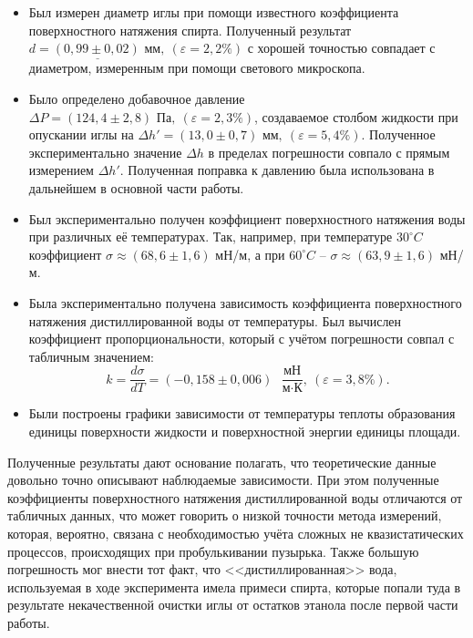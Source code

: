 \documentclass[a4paper, 12pt]{article}
\begin{document}
    \begin{itemize}
        \item Был измерен диаметр иглы при помощи известного коэффициента поверхностного натяжения спирта. Полученный результат $\underline{ d = (0,99 \pm 0,02) \text{ мм},} \: (\varepsilon = 2,2\%)$ с хорошей точностью совпадает с диаметром, измеренным при помощи светового микроскопа.
    	
        \item Было определено добавочное давление ${\Delta P = (124,4 \pm 2,8) \text{ Па},} \: (\varepsilon = 2,3\%)$, создаваемое столбом жидкости при опускании иглы на ${\Delta h' = (13,0 \pm 0,7) \text{ мм},} \: (\varepsilon = 5,4\%). $ Полученное экспериментально значение $\Delta h$ в пределах погрешности совпало с прямым измерением $\Delta h'$. Полученная поправка к давлению была использована в дальнейшем в основной части работы.
    	
        \item Был экспериментально получен коэффициент поверхностного натяжения воды при различных её температурах. Так, например, при температуре $30^\circ C$ коэффициент $ \sigma \approx (68,6 \pm 1,6) $ мН/м, а при $60^\circ C $ -- $ \sigma \approx (63,9 \pm 1,6) $ мН/м.
    	
        \item Была экспериментально получена зависимость коэффициента поверхностного натяжения дистиллированной воды от температуры. Был вычислен коэффициент пропорциональности, который с учётом погрешности совпал с табличным значением:
        $$\boxed{k = \frac{d\sigma}{dT} = (-0,158 \pm 0,006) \text{ } \frac{\text{мН}}{\text{м}\cdot\text{К}},} \: (\varepsilon = 3,8\%).$$
    	
        \item Были построены графики зависимости от температуры теплоты образования единицы поверхности жидкости и поверхностной энергии единицы площади.
    \end{itemize}
    
    \noindent Полученные результаты дают основание полагать, что теоретические данные довольно точно описывают наблюдаемые зависимости. При этом полученные коэффициенты поверхностного натяжения дистиллированной воды отличаются от табличных данных, что может говорить о низкой точности метода измерений, которая, вероятно, связана с необходимостью учёта сложных не квазистатических процессов, происходящих при пробулькивании пузырька. Также большую погрешность мог внести тот факт, что <<дистиллированная>> вода, используемая в ходе эксперимента имела примеси спирта, которые попали туда в результате некачественной очистки иглы от остатков этанола после первой части работы.  
\end{document}
